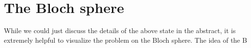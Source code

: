 \section{The Bloch sphere}

While we could just discuss the details of the above state in the abstract, it is extremely helpful to visualize the problem on the Bloch sphere. The idea of the B